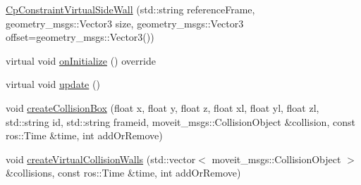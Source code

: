 \begin{DoxyCompactItemize}
\item 
\hyperlink{classsm__fetch__two__table__whiskey__pour_1_1cl__move__group__interface_1_1CpConstraintVirtualSideWall_a721630de1b2a1aa5dd246fcd775a21d0}{Cp\+Constraint\+Virtual\+Side\+Wall} (std\+::string reference\+Frame, geometry\+\_\+msgs\+::\+Vector3 size, geometry\+\_\+msgs\+::\+Vector3 offset=geometry\+\_\+msgs\+::\+Vector3())
\item 
virtual void \hyperlink{classsm__fetch__two__table__whiskey__pour_1_1cl__move__group__interface_1_1CpConstraintVirtualSideWall_a00d9f7eea9e5b91d4d2154c37e56f60e}{on\+Initialize} () override
\item 
virtual void \hyperlink{classsm__fetch__two__table__whiskey__pour_1_1cl__move__group__interface_1_1CpConstraintVirtualSideWall_a2295eef9dd270ab1e9d2b0837f103352}{update} ()
\item 
void \hyperlink{classsm__fetch__two__table__whiskey__pour_1_1cl__move__group__interface_1_1CpConstraintVirtualSideWall_ae495cc19dbaacf4cc7f4df803193ae92}{create\+Collision\+Box} (float x, float y, float z, float xl, float yl, float zl, std\+::string id, std\+::string frameid, moveit\+\_\+msgs\+::\+Collision\+Object \&collision, const ros\+::\+Time \&time, int add\+Or\+Remove)
\item 
void \hyperlink{classsm__fetch__two__table__whiskey__pour_1_1cl__move__group__interface_1_1CpConstraintVirtualSideWall_ad4ecafb1a6c5cc8f72f04643047c0b03}{create\+Virtual\+Collision\+Walls} (std\+::vector$<$ moveit\+\_\+msgs\+::\+Collision\+Object $>$ \&collisions, const ros\+::\+Time \&time, int add\+Or\+Remove)
\end{DoxyCompactItemize}
